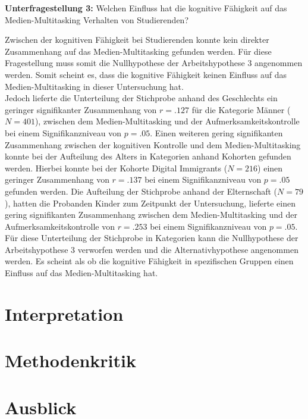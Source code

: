 \par
\textbf{Unterfragestellung 3:} Welchen Einfluss hat die kognitive Fähigkeit auf das Medien-Multitasking Verhalten von Studierenden?
\par
Zwischen der kognitiven Fähigkeit bei Studierenden konnte kein direkter Zusammenhang auf das Medien-Multitasking gefunden werden. Für diese Fragestellung muss somit die Nullhypothese der Arbeitshypothese 3 angenommen werden. Somit scheint es, dass die kognitive Fähigkeit keinen Einfluss auf das Medien-Multitasking in dieser Untersuchung hat. \\
Jedoch lieferte die Unterteilung der Stichprobe anhand des Geschlechts ein geringer signifikanter Zusammenhang von $r=.127$ für die Kategorie Männer ($N=401$), zwischen dem Medien-Multitasking und der Aufmerksamkeitskontrolle bei einem Signifikanzniveau von $p=.05$. Einen weiteren gering signifikanten Zusammenhang zwischen der kognitiven Kontrolle und dem Medien-Multitasking konnte bei der Aufteilung des Alters in Kategorien anhand Kohorten gefunden werden. Hierbei konnte bei der Kohorte Digital Immigrants ($N=216$) einen geringer Zusammenhang von $r=.137$ bei einem Signifikanzniveau von $p=.05$ gefunden werden. Die Aufteilung der Stichprobe anhand der Elternschaft ($N=79$), hatten die Probanden Kinder zum Zeitpunkt der Untersuchung, lieferte einen gering signifikanten Zusammenhang zwischen dem Medien-Multitasking und der Aufmerksamkeitskontrolle von $r=.253$ bei einem Signifikanzniveau von $p=.05$. Für diese Unterteilung der Stichprobe in Kategorien kann die Nullhypothese der Arbeitshypothese 3 verworfen werden und die Alternativhypothese angenommen werden. Es scheint als ob die kognitive Fähigkeit in spezifischen Gruppen einen Einfluss auf das Medien-Multitasking hat.
\section{Interpretation}\label{section.diskussion.interpretation}
\section{Methodenkritik}\label{section.diskussion.methodenkritik}
\section{Ausblick}\label{section.diskussion.ausblick}


